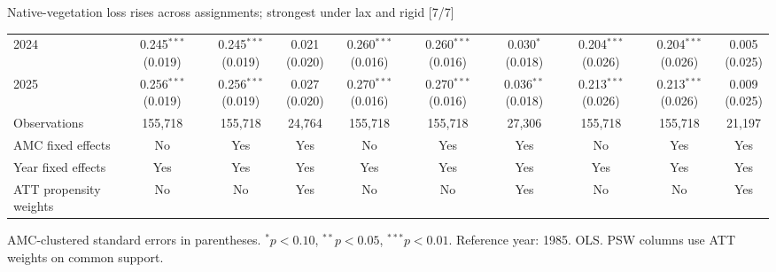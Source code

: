 \documentclass[aspectratio=169]{beamer}
\begin{document}
\begin{frame}{Native-vegetation loss rises across assignments; strongest under lax and rigid [7/7]}
{\begin{tabular}{@{}l*{9}{c}@{}}
2024 & \shortstack{0.245$^{***}$\\(0.019)} & \shortstack{0.245$^{***}$\\(0.019)} & \shortstack{0.021\\(0.020)} & \shortstack{0.260$^{***}$\\(0.016)} & \shortstack{0.260$^{***}$\\(0.016)} & \shortstack{0.030$^{*}$\\(0.018)} & \shortstack{0.204$^{***}$\\(0.026)} & \shortstack{0.204$^{***}$\\(0.026)} & \shortstack{0.005\\(0.025)} \\
2025 & \shortstack{0.256$^{***}$\\(0.019)} & \shortstack{0.256$^{***}$\\(0.019)} & \shortstack{0.027\\(0.020)} & \shortstack{0.270$^{***}$\\(0.016)} & \shortstack{0.270$^{***}$\\(0.016)} & \shortstack{0.036$^{**}$\\(0.018)} & \shortstack{0.213$^{***}$\\(0.026)} & \shortstack{0.213$^{***}$\\(0.026)} & \shortstack{0.009\\(0.025)} \\
\midrule
Observations & 155,718 & 155,718 & 24,764 & 155,718 & 155,718 & 27,306 & 155,718 & 155,718 & 21,197 \\
AMC fixed effects & No & Yes & Yes & No & Yes & Yes & No & Yes & Yes \\
Year fixed effects & Yes & Yes & Yes & Yes & Yes & Yes & Yes & Yes & Yes \\
ATT propensity weights & No & No & Yes & No & No & Yes & No & No & Yes \\
\bottomrule
\end{tabular}%
}
\vspace{0.1em}
{\tiny\color{ZMidGray} AMC-clustered standard errors in parentheses. $^{*}p<0.10$, $^{**}p<0.05$, $^{***}p<0.01$. Reference year: 1985. OLS. PSW columns use ATT weights on common support.}
\end{frame}
\end{document}
